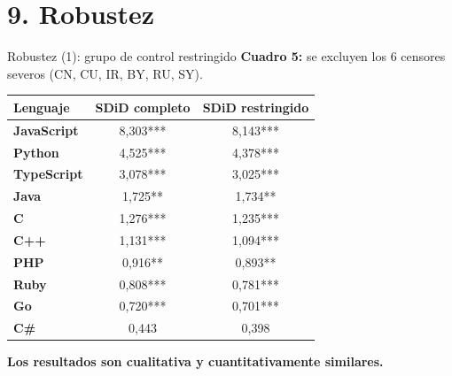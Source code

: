 \documentclass[10pt,aspectratio=169]{beamer}
\begin{document}
\section{9. Robustez}

\begin{frame}{Robustez (1): grupo de control restringido}
\textbf{Cuadro 5:} se excluyen los 6 censores severos (CN, CU, IR, BY, RU, SY).

\vspace{0.3em}
\renewcommand{\arraystretch}{1.30}
\centering
\small
\begin{tabular}{lcc}
\toprule
\textbf{Lenguaje} & \textbf{SDiD completo} & \textbf{SDiD restringido} \\
\midrule
\textbf{JavaScript} & 8,303*** & 8,143*** \\
\textbf{Python}     & 4,525*** & 4,378*** \\
\textbf{TypeScript} & 3,078*** & 3,025*** \\
\textbf{Java}       & 1,725**  & 1,734** \\
\textbf{C}          & 1,276*** & 1,235*** \\
\textbf{C++}        & 1,131*** & 1,094*** \\
\textbf{PHP}        & 0,916**  & 0,893** \\
\textbf{Ruby}       & 0,808*** & 0,781*** \\
\textbf{Go}         & 0,720*** & 0,701*** \\
\textbf{C\#}        & 0,443    & 0,398 \\
\bottomrule
\end{tabular}

\vspace{0.4em}
\centering \alert{\textbf{Los resultados son cualitativa y cuantitativamente similares.}}
\end{frame}
\end{document}
